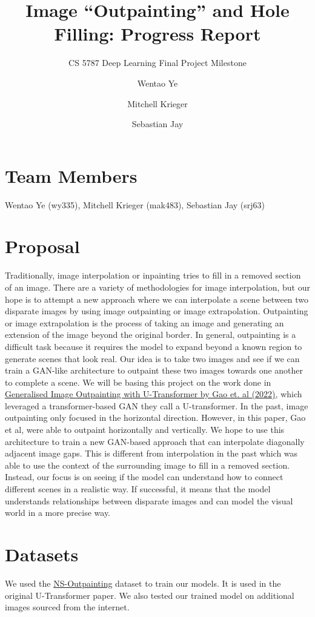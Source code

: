\documentclass[sigconf]{acmart}
\title{Image “Outpainting” and Hole Filling: Progress Report}
\subtitle{CS 5787 Deep Learning Final Project Milestone}
\author{Wentao Ye}
\affiliation{%
  \institution{Cornell University}
}
\author{Mitchell Krieger}
\affiliation{%
  \institution{Cornell University}
}
\author{Sebastian Jay}
\affiliation{%
  \institution{Cornell University}
}
\begin{document}
\maketitle

\section*{Team Members}
Wentao Ye (wy335), Mitchell Krieger (mak483), Sebastian Jay (srj63)

\section*{Proposal}
Traditionally, image interpolation or inpainting tries to fill in a removed section of an image. There are a variety of methodologies for image interpolation, but our hope is to attempt a new approach where we can interpolate a scene between two disparate images by using image outpainting or image extrapolation. Outpainting or image extrapolation is the process of taking an image and generating an extension of the image beyond the original border. In general, outpainting is a difficult task because it requires the model to expand beyond a known region to generate scenes that look real. Our idea is to take two images and see if we can train a GAN-like architecture to outpaint these two images towards one another to complete a scene. We will be basing this project on the work done in \href{https://arxiv.org/abs/2201.11403}{Generalised Image Outpainting with U-Transformer by Gao et. al (2022)}, which leveraged a transformer-based GAN they call a U-transformer. In the past, image outpainting only focused in the horizontal direction. However, in this paper, Gao et al, were able to outpaint horizontally and vertically. We hope to use this architecture to train a new GAN-based approach that can interpolate diagonally adjacent image gaps. This is different from interpolation in the past which was able to use the context of the surrounding image to fill in a removed section. Instead, our focus is on seeing if the model can understand how to connect different scenes in a realistic way. If successful, it means that the model understands relationships between disparate images and can model the visual world in a more precise way.

\section*{Datasets}
We used the \textcolor{red}{\href{https://github.com/z-x-yang/NS-Outpainting}{NS-Outpainting}} dataset to train our models. It is used in the original U-Transformer paper. We also tested our trained model on additional images sourced from the internet.
\end{document}
